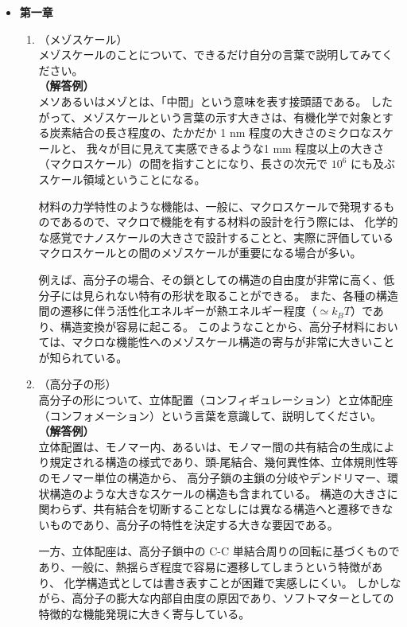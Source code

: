 \documentclass[uplatex,dvipdfmx,a4paper,11pt, titlepage]{jsarticle}
\begin{document}
\begin{itemize}
\item
{\bf 第一章}

	\begin{enumerate}
		\item
		（メゾスケール）\\
		メゾスケールのことについて、できるだけ自分の言葉で説明してみてください。\\
		{\bf（解答例）}\\
		メソあるいはメゾとは、「中間」という意味を表す接頭語である。
		したがって、メゾスケールという言葉の示す大きさは、有機化学で対象とする炭素結合の長さ程度の、たかだか 1 nm 程度の大きさのミクロなスケールと、
		我々が目に見えて実感できるような1 mm 程度以上の大きさ（マクロスケール）の間を指すことになり、長さの次元で $10^6$ にも及ぶスケール領域ということになる。

		材料の力学特性のような機能は、一般に、マクロスケールで発現するものであるので、マクロで機能を有する材料の設計を行う際には、
		化学的な感覚でナノスケールの大きさで設計することと、実際に評価しているマクロスケールとの間のメゾスケールが重要になる場合が多い。

		例えば、高分子の場合、その鎖としての構造の自由度が非常に高く、低分子には見られない特有の形状を取ることができる。
		また、各種の構造間の遷移に伴う活性化エネルギーが熱エネルギー程度（$\simeq k_B T$）であり、構造変換が容易に起こる。
		このようなことから、高分子材料においては、マクロな機能性へのメゾスケール構造の寄与が非常に大きいことが知られている。

		\item
		（高分子の形）\\
		高分子の形について、立体配置（コンフィギュレーション）と立体配座（コンフォメーション）という言葉を意識して、説明してください。\\
		{\bf（解答例）}\\
		立体配置は、モノマー内、あるいは、モノマー間の共有結合の生成により規定される構造の様式であり、頭-尾結合、幾何異性体、立体規則性等のモノマー単位の構造から、
		高分子鎖の主鎖の分岐やデンドリマー、環状構造のような大きなスケールの構造も含まれている。
		構造の大きさに関わらず、共有結合を切断することなしには異なる構造へと遷移できないものであり、高分子の特性を決定する大きな要因である。

		一方、立体配座は、高分子鎖中の C-C 単結合周りの回転に基づくものであり、一般に、熱揺らぎ程度で容易に遷移してしまうという特徴があり、
		化学構造式としては書き表すことが困難で実感しにくい。
		しかしながら、高分子の膨大な内部自由度の原因であり、ソフトマターとしての特徴的な機能発現に大きく寄与している。



\end{enumerate}
\end{itemize}
\end{document}
